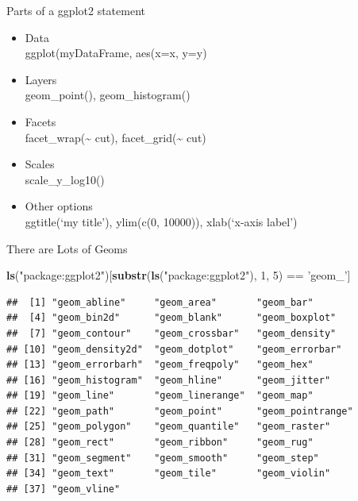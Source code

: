 \documentclass[ignorenonframetext,]{beamer}
\newenvironment{Shaded}{\begin{snugshade}}{\end{snugshade}}
\newcommand{\KeywordTok}[1]{\textcolor[rgb]{0.13,0.29,0.53}{\textbf{{#1}}}}
\newcommand{\DecValTok}[1]{\textcolor[rgb]{0.00,0.00,0.81}{{#1}}}
\newcommand{\StringTok}[1]{\textcolor[rgb]{0.31,0.60,0.02}{{#1}}}
\newcommand{\NormalTok}[1]{{#1}}
\begin{document}
\begin{frame}{Parts of a ggplot2 statement}

\begin{itemize}[<+->]
\itemsep1pt\parskip0pt
\item
  Data\\ ggplot(myDataFrame, aes(x=x, y=y)
\item
  Layers\\ geom\_point(), geom\_histogram()
\item
  Facets\\ facet\_wrap(\textasciitilde{} cut),
  facet\_grid(\textasciitilde{} cut)
\item
  Scales\\ scale\_y\_log10()
\item
  Other options\\ ggtitle(`my title'), ylim(c(0, 10000)), xlab(`x-axis
  label')
\end{itemize}

\end{frame}

\begin{frame}[fragile]{There are Lots of Geoms}

\begin{Shaded}
\begin{Highlighting}[]
\KeywordTok{ls}\NormalTok{(}\StringTok{"package:ggplot2"}\NormalTok{)[}\KeywordTok{substr}\NormalTok{(}\KeywordTok{ls}\NormalTok{(}\StringTok{"package:ggplot2"}\NormalTok{), }
                             \DecValTok{1}\NormalTok{, }\DecValTok{5}\NormalTok{) ==}\StringTok{ 'geom_'}\NormalTok{]}
\end{Highlighting}
\end{Shaded}

\begin{verbatim}
##  [1] "geom_abline"     "geom_area"       "geom_bar"       
##  [4] "geom_bin2d"      "geom_blank"      "geom_boxplot"   
##  [7] "geom_contour"    "geom_crossbar"   "geom_density"   
## [10] "geom_density2d"  "geom_dotplot"    "geom_errorbar"  
## [13] "geom_errorbarh"  "geom_freqpoly"   "geom_hex"       
## [16] "geom_histogram"  "geom_hline"      "geom_jitter"    
## [19] "geom_line"       "geom_linerange"  "geom_map"       
## [22] "geom_path"       "geom_point"      "geom_pointrange"
## [25] "geom_polygon"    "geom_quantile"   "geom_raster"    
## [28] "geom_rect"       "geom_ribbon"     "geom_rug"       
## [31] "geom_segment"    "geom_smooth"     "geom_step"      
## [34] "geom_text"       "geom_tile"       "geom_violin"    
## [37] "geom_vline"
\end{verbatim}

\end{frame}
\end{document}
